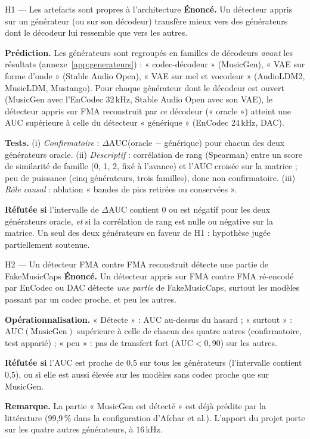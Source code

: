 \documentclass[11pt,a4paper]{article}
\newcommand{\AUC}{\textrm{AUC}}
\begin{document}
\begin{hyp}{H1 --- Les artefacts sont propres à l'architecture}
\textbf{Énoncé.} Un détecteur appris sur un générateur (ou sur son décodeur) transfère mieux vers des générateurs dont le décodeur lui ressemble que vers les autres.

\textbf{Prédiction.} Les générateurs sont regroupés en familles de décodeurs \emph{avant} les résultats (annexe~\ref{app:generateurs}) : « codec-décodeur » (MusicGen), « VAE sur forme d'onde » (Stable Audio Open), « VAE sur mel et vocodeur » (AudioLDM2, MusicLDM, Mustango). Pour chaque générateur dont le décodeur est ouvert (MusicGen avec l'EnCodec 32\,kHz, Stable Audio Open avec son VAE), le détecteur appris sur FMA reconstruit par \emph{ce} décodeur (« oracle ») atteint une AUC supérieure à celle du détecteur « générique » (EnCodec 24\,kHz, DAC).

\textbf{Tests.} (i) \emph{Confirmatoire} : $\Delta\AUC$(oracle $-$ générique) pour chacun des deux générateurs oracle. (ii) \emph{Descriptif} : corrélation de rang (Spearman) entre un score de similarité de famille (0, 1, 2, fixé à l'avance) et l'AUC croisée sur la matrice ; peu de puissance (cinq générateurs, trois familles), donc non confirmatoire. (iii) \emph{Rôle causal} : ablation « bandes de pics retirées ou conservées ».

\textbf{Réfutée si} l'intervalle de $\Delta\AUC$ contient 0 ou est négatif pour les deux générateurs oracle, \emph{et} si la corrélation de rang est nulle ou négative sur la matrice. Un seul des deux générateurs en faveur de H1 : hypothèse jugée partiellement soutenue.
\end{hyp}

\begin{hyp}{H2 --- Un détecteur FMA contre FMA reconstruit détecte une partie de FakeMusicCaps}
\textbf{Énoncé.} Un détecteur appris sur FMA contre FMA ré-encodé par EnCodec ou DAC détecte \emph{une partie} de FakeMusicCaps, surtout les modèles passant par un codec proche, et peu les autres.

\textbf{Opérationnalisation.} « Détecte » : AUC au-dessus du hasard ; « surtout » : $\AUC(\text{MusicGen})$ supérieure à celle de chacun des quatre autres (confirmatoire, test apparié) ; « peu » : pas de transfert fort ($\AUC < 0{,}90$) sur les autres.

\textbf{Réfutée si} l'AUC est proche de 0,5 sur tous les générateurs (l'intervalle contient 0,5), ou si elle est aussi élevée sur les modèles sans codec proche que sur MusicGen.

\textbf{Remarque.} La partie « MusicGen est détecté » est déjà prédite par la littérature (99,9\,\% dans la configuration d'Afchar et al.). L'apport du projet porte sur les quatre autres générateurs, à 16\,kHz.
\end{hyp}
\end{document}
